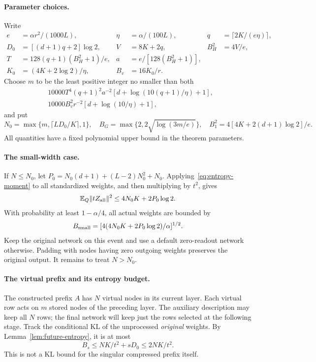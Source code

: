 \paragraph{Parameter choices.}
Write
\begin{align*}
 e&=\alpha r^2/(1000L),& \eta&=\alpha/(100L),&
 q&=\lceil2K/(e\eta)\rceil,\\
 D_0&=[(d+1)q+2]\log2,& V&=8K+2q,& B_H^2&=4V/e,\\
 T&=128(q+1)(B_H^2+1)/e,& a&=e/[128(B_H^2+1)],\\
 K_0&=(4K+2\log2)/\eta,& B_v&=16K_0/r.
\end{align*}
Choose $m$ to be the least positive integer no smaller than both
\begin{align*}
 &10000T^4(q+1)^2a^{-2}[d+\log(10(q+1)/\eta)+1],\\
 &10000B_v^2r^{-2}[d+\log(10/\eta)+1],
\end{align*}
and put
\[
 N_0=\max\{m,\lceil LD_0/K\rceil,1\},\quad
 B_G=\max\{2,2\sqrt{\log(3m/e)}\},\quad
 B_1^2=4[4K+2(d+1)\log2]/e.
\]
All quantities have a fixed polynomial upper bound in the theorem parameters.

\paragraph{The small-width case.}
If $N\le N_0$, let
$P_0=N_0(d+1)+(L-2)N_0^2+N_0$. Applying~\eqref{eq:entropy-moment} to all
standardized weights, and then multiplying by $t^2$, gives
\[
 \mathbb E_Q\|tZ_{\rm all}\|^2\le4N_0K+2P_0\log2.
\]
With probability at least $1-\alpha/4$, all actual weights are bounded by
\[
 B_{\rm small}=[4(4N_0K+2P_0\log2)/\alpha]^{1/2}.
\]
Keep the original network on this event and use a default zero-readout network otherwise.
Padding with nodes having zero outgoing weights preserves the original output.
It remains to treat $N>N_0$.

\paragraph{The virtual prefix and its entropy budget.}
The constructed prefix $A$ has $N$ virtual nodes in its current layer. Each
virtual row acts on $m$ stored nodes of the preceding layer. The auxiliary
description may keep all $N$ rows; the final network will keep just the rows
selected at the following stage. Track the conditional KL of the unprocessed
\emph{original} weights. By Lemma~\ref{lem:future-entropy}, it is at most
\[
 B_s\le NK/t^2+sD_0\le2NK/t^2.                              \tag{*}
\]
This is not a KL bound for the singular compressed prefix itself.

